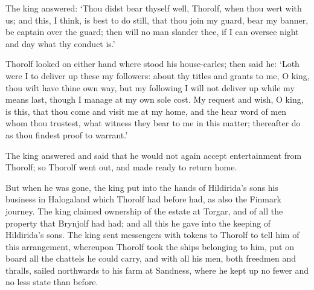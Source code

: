 The king answered: `Thou didst bear thyself well, Thorolf, when thou wert with us; and this, I think, is best to do still, that thou join my guard, bear my banner, be captain over the guard; then will no man slander thee, if I can oversee night and day what thy conduct is.'

Thorolf looked on either hand where stood his house-carles; then said he: `Loth were I to deliver up these my followers: about thy titles and grants to me, O king, thou wilt have thine own way, but my following I will not deliver up while my means last, though I manage at my own sole cost. My request and wish, O king, is this, that thou come and visit me at my home, and the hear word of men whom thou trustest, what witness they bear to me in this matter; thereafter do as thou findest proof to warrant.'

The king answered and said that he would not again accept entertainment from Thorolf; so Thorolf went out, and made ready to return home.

But when he was gone, the king put into the hands of Hildirida's sons his business in Halogaland which Thorolf had before had, as also the Finmark journey. The king claimed ownership of the estate at Torgar, and of all the property that Brynjolf had had; and all this he gave into the keeping of Hildirida's sons. The king sent messengers with tokens to Thorolf to tell him of this arrangement, whereupon Thorolf took the ships belonging to him, put on board all the chattels he could carry, and with all his men, both freedmen and thralls, sailed northwards to his farm at Sandness, where he kept up no fewer and no less state than before.
